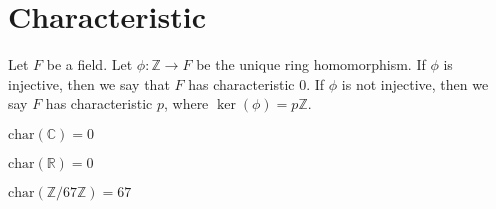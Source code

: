 \section{Characteristic}
\begin{definition}[Characteristic]
	Let \(F\) be a field. Let \(\phi \colon \mathbb{Z} \to F\) be the unique ring homomorphism. If \(\phi \) is injective, then we say that \(F\) has characteristic \(0\). If \(\phi \) is not injective, then we say \(F\) has characteristic \(p\), where \(\ker(\phi ) = p\mathbb{Z} \).
\end{definition}
\begin{eg}
	\(\text{char}(\mathbb{C} ) = 0\)
\end{eg}
\begin{eg}
	\(\text{char}(\mathbb{R} ) = 0\)
\end{eg}
\begin{eg}
	\(\text{char}(\mathbb{Z} / 67\mathbb{Z}  ) = 67\)
\end{eg}

